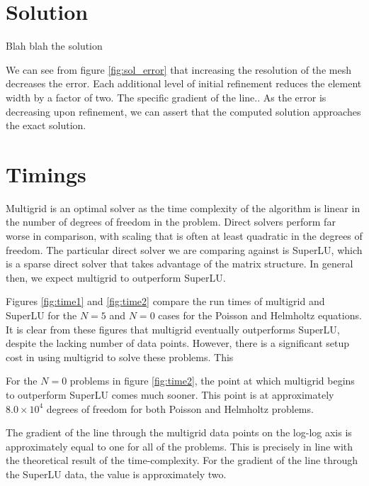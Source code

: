 
\section{Solution}



Blah blah the solution

We can see from figure \ref{fig:sol_error} that increasing the resolution of the mesh decreases the error.
Each additional level of initial refinement reduces the element width by a factor of two.
The specific gradient of the line.. %
As the error is decreasing upon refinement, we can assert that the computed solution approaches the exact solution.








\section{Timings}

Multigrid is an optimal solver as the time complexity of the algorithm is linear in the number of degrees of freedom in the problem.
Direct solvers perform far worse in comparison, with scaling that is often at least quadratic in the degrees of freedom.
The particular direct solver we are comparing against is SuperLU, which is a sparse direct solver that takes advantage of the matrix structure.
In general then, we expect multigrid to outperform SuperLU.

Figures \ref{fig:time1} and \ref{fig:time2} compare the run times of multigrid and SuperLU for the $N=5$ and $N=0$ cases for the Poisson and Helmholtz equations.
It is clear from these figures that multigrid eventually outperforms SuperLU, despite the lacking number of data points.
However, there is a significant setup cost in using multigrid to solve these problems.
This 

For the $N=0$ problems in figure \ref{fig:time2}, the point at which multigrid begins to outperform SuperLU comes much sooner.
This point is at approximately $8.0\times 10^4$ degrees of freedom for both Poisson and Helmholtz problems.

The gradient of the line through the multigrid data points on the log-log axis is approximately equal to one for all of the problems.
This is precisely in line with the theoretical result of the time-complexity.
For the gradient of the line through the SuperLU data, the value is approximately two.

